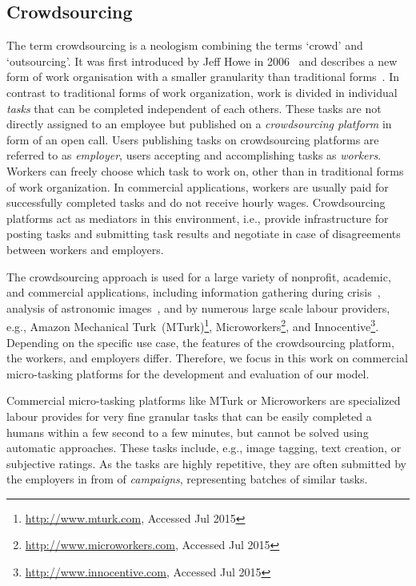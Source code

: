 \subsection{Crowdsourcing}
The term crowdsourcing is a neologism combining the terms `crowd' and `outsourcing'.
It was first introduced by Jeff Howe in 2006~\cite{Howe2006} and describes a new form of work organisation with a smaller granularity than traditional forms~\cite{Hossfeld2011c}.
In contrast to traditional forms of work organization, work is divided in individual \emph{tasks} that can be completed independent of each others. 
These tasks are not directly assigned to an employee but published on a \emph{crowdsourcing platform} in form of an open call.
Users publishing tasks on crowdsourcing platforms are referred to as \emph{employer}, users accepting and accomplishing tasks as \emph{workers}.
Workers can freely choose which task to work on, other than in traditional forms of work organization.
In commercial applications, workers are usually paid for successfully completed tasks and do not receive hourly wages.
Crowdsourcing platforms act as mediators in this environment, i.e., provide infrastructure for posting tasks and submitting task results and negotiate in case of disagreements between workers and employers.

The crowdsourcing approach is used for a large variety of nonprofit, academic, and commercial applications, including information gathering during crisis~\cite{Morrow2011}, analysis of astronomic images~\cite{Raddick2010}, and by numerous large scale labour providers, e.g., Amazon Mechanical Turk~(MTurk)\footnote{\url{http://www.mturk.com}, Accessed Jul 2015}, Microworkers\footnote{\url{http://www.microworkers.com}, Accessed Jul 2015}, and Innocentive\footnote{\url{http://www.innocentive.com}, Accessed Jul 2015}.
Depending on the specific use case, the features of the crowdsourcing platform, the workers, and employers differ.
Therefore, we focus in this work on commercial micro-tasking platforms for the development and evaluation of our model.

Commercial micro-tasking platforms like MTurk or Microworkers are specialized labour provides for very fine granular tasks that can be easily completed a humans within a few second to a few minutes, but cannot be solved using automatic approaches. 
These tasks include, e.g., image tagging, text creation, or subjective ratings.
As the tasks are highly repetitive, they are often submitted by the employers in from of \emph{campaigns}, representing batches of similar tasks.

